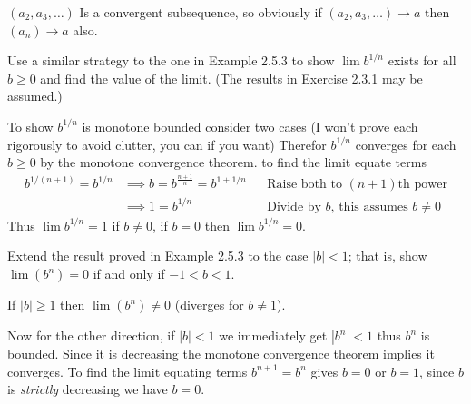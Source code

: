\begin{solution}
  $(a_2, a_3, \dots)$ Is a convergent subsequence, so obviously if $(a_2, a_3, \dots) \to a$ then $(a_n) \to a$ also.
\end{solution}

\begin{exercise}
  Use a similar strategy to the one in Example 2.5.3 to show $\lim b^{1 / n}$ exists for all $b \geq 0$ and find the value of the limit. (The results in Exercise 2.3.1 may be assumed.)
\end{exercise}

\begin{solution}
  To show $b^{1/n}$ is monotone bounded consider two cases (I won't prove each rigorously to avoid clutter, you can if you want)
  Therefor $b^{1/n}$ converges for each $b \ge 0$ by the monotone convergence theorem. to find the limit equate terms
  $$
  \begin{aligned}
  b^{1/{(n+1)}}
  = b^{1/n}
  &\implies b = b^{\frac{n+1}{n}} = b^{1 + 1/n} &&\text{Raise both to $(n+1)$th power} \\
  &\implies 1 = b^{1/n}                         &&\text{Divide by $b$, this assumes $b \ne 0$}
  \end{aligned}
  $$
  Thus $\lim b^{1/n} = 1$ if $b \ne 0$, if $b = 0$ then $\lim b^{1/n} = 0$.
\end{solution}

\begin{exercise}
  Extend the result proved in Example 2.5.3 to the case $|b|<1$; that is, show $\lim \left(b^{n}\right)=0$ if and only if $-1<b<1$.
\end{exercise}

\begin{solution}
  If $|b| \ge 1$ then $\lim (b^n) \ne 0$ (diverges for $b \ne 1$).

  Now for the other direction, if $|b| < 1$ we immediately get $|b^n| < 1$ thus $b^n$ is bounded.
  Since it is decreasing the monotone convergence theorem implies it converges.
  To find the limit equating terms $b^{n+1} = b^{n}$ gives $b = 0$ or $b = 1$, since $b$ is \emph{strictly} decreasing we have $b = 0$.
\end{solution}

